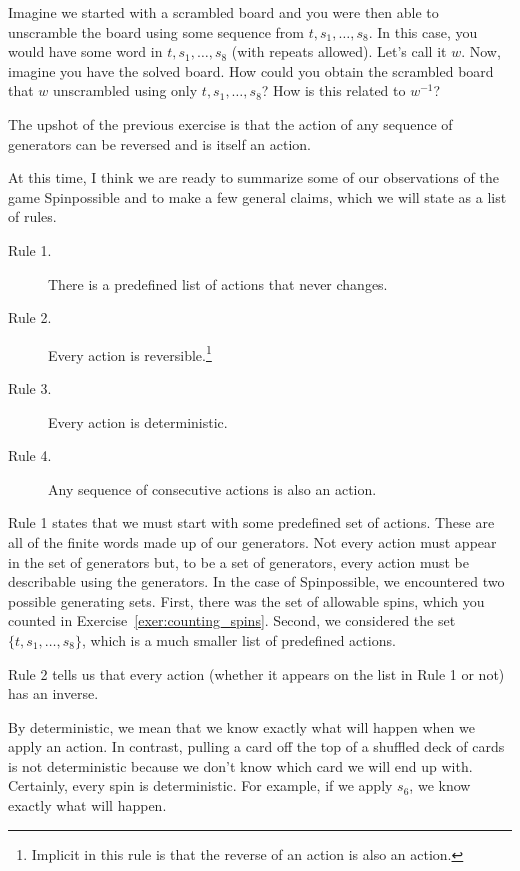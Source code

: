 \begin{exercise}
Imagine we started with a scrambled board and you were then able to unscramble the board using some sequence from $t, s_1, \ldots, s_8$.  In this case, you would have some word in $t, s_1, \ldots, s_8$ (with repeats allowed). Let's call it $w$.  Now, imagine you have the solved board.  How could you obtain the scrambled board that $w$ unscrambled using only $t, s_1,\ldots, s_8$? How is this related to $w^{-1}$?
\end{exercise}

The upshot of the previous exercise is that the action of any sequence of generators can be reversed and is itself an action.

At this time, I think we are ready to summarize some of our observations of the game Spinpossible and to make a few general claims, which we will state as a list of rules.

\begin{description}
\item[Rule 1.] There is a predefined list of actions that never changes.
\item[Rule 2.] Every action is reversible.\footnote{Implicit in this rule is that the reverse of an action is also an action.}
\item[Rule 3.] Every action is deterministic.
\item[Rule 4.] Any sequence of consecutive actions is also an action.
\end{description}

Rule 1 states that we must start with some predefined set of actions. These are all of the finite words made up of our generators.  Not every action must appear in the set of generators but, to be a set of generators, every action must be describable using the generators.  In the case of Spinpossible, we encountered two possible generating sets.  First, there was the set of allowable spins, which you counted in Exercise~\ref{exer:counting_spins}.  Second, we considered the set $\{t,s_1,\ldots, s_8\}$, which is a much smaller list of predefined actions.

Rule 2 tells us that every action (whether it appears on the list in Rule 1 or not) has an inverse.

By deterministic, we mean that we know exactly what will happen when we apply an action.  In contrast, pulling a card off the top of a shuffled deck of cards is not deterministic because we don't know which card we will end up with. Certainly, every spin is deterministic. For example, if we apply $s_6$, we know exactly what will happen.

